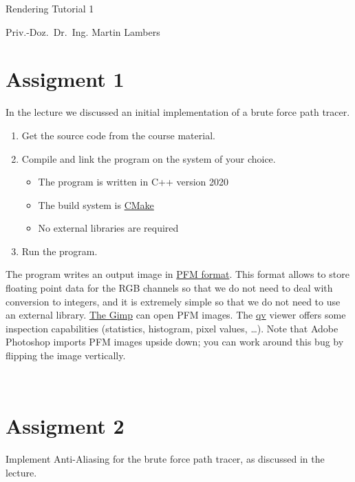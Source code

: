 \documentclass[a4paper,11pt]{article}
\newcommand{\authortitle}{Priv.-Doz.~Dr.~Ing.}
\newcommand{\authorname}{Martin Lambers}
\newcommand{\course}{Rendering}
\newcommand{\tutorial}{Tutorial 1}
\begin{document}
\thispagestyle{empty}

\LARGE

\centerline{\course{} \tutorial}

\vspace{1ex}

\normalsize

\centerline{\authortitle{} \authorname}


\section*{Assigment 1}

In the lecture we discussed an initial implementation of a brute force path
tracer.

\begin{enumerate}
\item Get the source code from the course material.
\item Compile and link the program on the system of your choice.
    \begin{itemize}
    \item The program is written in C++ version 2020
    \item The build system is \href{https://cmake.org/}{CMake}
    \item No external libraries are required
    \end{itemize}
\item Run the program.
\end{enumerate}

The program writes an output image in
\href{http://www.pauldebevec.com/Research/HDR/PFM/}{PFM format}. This format allows to
store floating point data for the RGB channels so that we do not need to deal
with conversion to integers, and it is extremely simple so that we do not need
to use an external library. \href{https://www.gimp.org/}{The Gimp} can open PFM
images. The \href{https://marlam.de/qv}{qv} viewer offers some inspection
capabilities (statistics, histogram, pixel values, \ldots{}). Note that Adobe Photoshop imports PFM images upside down; you can work
around this bug by flipping the image vertically.

~


\section*{Assigment 2}

Implement Anti-Aliasing for the brute force path tracer, as discussed in the
lecture.
\end{document}
